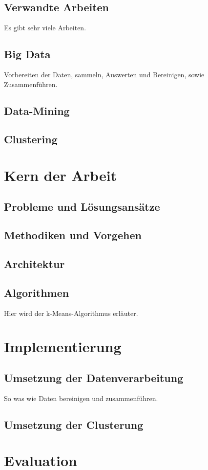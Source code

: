 \section{Verwandte Arbeiten}
Es gibt sehr viele Arbeiten.
\section{Big Data}
Vorbereiten der Daten, sammeln, Auswerten und Bereinigen, sowie Zusammenführen.
\section{Data-Mining}
\section{Clustering}

\chapter{Kern der Arbeit}
\section{Probleme und Lösungsansätze}
\section{Methodiken und Vorgehen}
\section{Architektur}
\section{Algorithmen}
Hier wird der k-Means-Algorithmus erläuter.

\chapter{Implementierung}
\section{Umsetzung der Datenverarbeitung}
So was wie Daten bereinigen und zusammenführen.
\section{Umsetzung der Clusterung}

\chapter{Evaluation}
